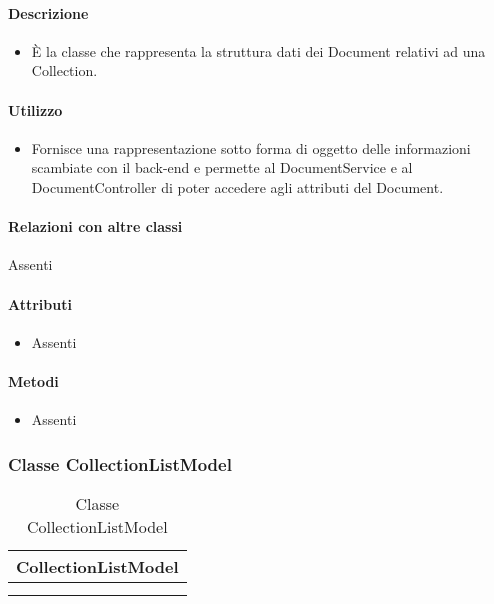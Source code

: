 \paragraph*{Descrizione}
\begin{itemize}
\item[] È la classe che rappresenta la struttura dati dei Document relativi ad una Collection.
\end{itemize}

\paragraph*{Utilizzo}
\begin{itemize}
\item[] Fornisce una rappresentazione sotto forma di oggetto delle informazioni scambiate con il back-end e permette al DocumentService e al DocumentController di poter accedere agli attributi del Document.
\end{itemize}

\paragraph*{Relazioni con altre classi}
Assenti

\paragraph*{Attributi}
\begin{itemize}
\item[] Assenti
\end{itemize}

\paragraph*{Metodi}
\begin{itemize}
\item[] Assenti
\end{itemize}

\subsubsection{Classe CollectionListModel}

\begin{table}[ht]
\begin{center}
\bgroup
\setlength{\arrayrulewidth}{0.6mm}
\def\arraystretch{1}
\begin{tabular}{ | p{12cm} | }
\hline
\centerline{\textbf{CollectionListModel}}
\\ \hline
 \\ 
\hline
 \\ 
\hline
\end{tabular}
\egroup
\caption{Classe CollectionListModel}
\end{center}
\end{table}

